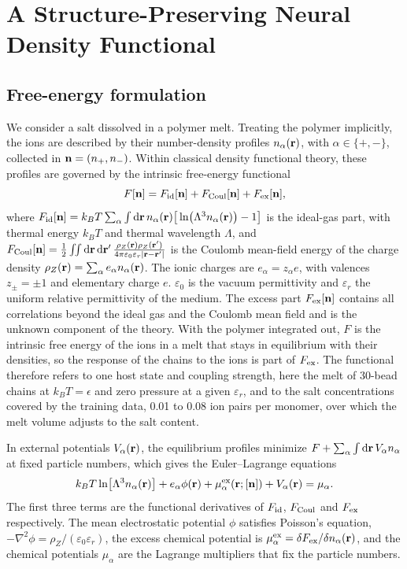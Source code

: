 \section*{A Structure-Preserving Neural Density Functional}

\subsection*{Free-energy formulation}
We consider a salt dissolved in a polymer melt. Treating the polymer implicitly, the ions are described by their number-density profiles $n_\alpha(\mathbf r)$, with $\alpha\in\{+,-\}$, collected in $\mathbf n=(n_+,n_-)$. Within classical density functional theory, these profiles are governed by the intrinsic free-energy functional
\begin{equation}
F[\mathbf n]=F_{\rm id}[\mathbf n]+F_{\rm Coul}[\mathbf n]+F_{\rm ex}[\mathbf n],
\label{eq:F}
\end{equation}
where
\(
F_{\rm id}[\mathbf n]=k_BT\sum_\alpha\int \mathrm d\mathbf r\,n_\alpha(\mathbf r)\big[\ln\!\big(\Lambda^3n_\alpha(\mathbf r)\big)-1\big]
\)
is the ideal-gas part, with thermal energy $k_BT$ and thermal wavelength $\Lambda$, and
\(
F_{\rm Coul}[\mathbf n]=\frac12\iint \mathrm d\mathbf r\,\mathrm d\mathbf r'\,\frac{\rho_Z(\mathbf r)\rho_Z(\mathbf r')}{4\pi\varepsilon_0\varepsilon_r|\mathbf r-\mathbf r'|}
\)
is the Coulomb mean-field energy of the charge density $\rho_Z(\mathbf r)=\sum_\alpha e_\alpha n_\alpha(\mathbf r)$. The ionic charges are $e_\alpha=z_\alpha e$, with valences $z_\pm=\pm1$ and elementary charge $e$. $\varepsilon_0$ is the vacuum permittivity and $\varepsilon_r$ the uniform relative permittivity of the medium. The excess part $F_{\rm ex}[\mathbf n]$ contains all correlations beyond the ideal gas and the Coulomb mean field and is the unknown component of the theory. With the polymer integrated out, $F$ is the intrinsic free energy of the ions in a melt that stays in equilibrium with their densities, so the response of the chains to the ions is part of $F_{\rm ex}$. The functional therefore refers to one host state and coupling strength, here the melt of 30-bead chains at $k_BT=\epsilon$ and zero pressure at a given $\varepsilon_r$, and to the salt concentrations covered by the training data, 0.01 to 0.08 ion pairs per monomer, over which the melt volume adjusts to the salt content.

In external potentials $V_\alpha(\mathbf r)$, the equilibrium profiles minimize $F+\sum_\alpha\int\mathrm d\mathbf r\,V_\alpha n_\alpha$ at fixed particle numbers, which gives the Euler--Lagrange equations
\begin{equation}
k_BT\ln\!\big[\Lambda^3 n_\alpha(\mathbf r)\big]+e_\alpha\phi(\mathbf r)+\mu^{\rm ex}_\alpha(\mathbf r;[\mathbf n])+V_\alpha(\mathbf r)=\mu_\alpha .
\label{eq:EL}
\end{equation}
The first three terms are the functional derivatives of $F_{\rm id}$, $F_{\rm Coul}$ and $F_{\rm ex}$ respectively. The mean electrostatic potential $\phi$ satisfies Poisson's equation, $-\nabla^2\phi=\rho_Z/(\varepsilon_0\varepsilon_r)$, the excess chemical potential is $\mu^{\rm ex}_\alpha=\delta F_{\rm ex}/\delta n_\alpha(\mathbf r)$, and the chemical potentials $\mu_\alpha$ are the Lagrange multipliers that fix the particle numbers.
 
